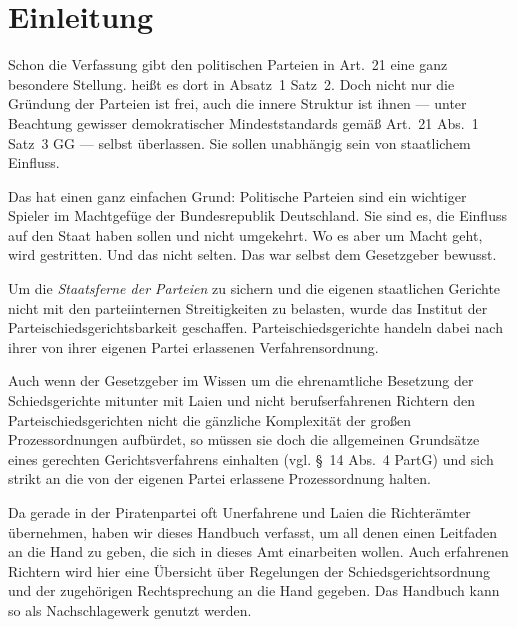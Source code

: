 
\chapter{Einleitung}
Schon die Verfassung gibt den politischen Parteien in Art.~21 eine ganz besondere Stellung.
 heißt es dort in Absatz~1 Satz~2.
Doch nicht nur die Gründung der Parteien ist frei, auch die innere Struktur ist ihnen --- unter Beachtung gewisser demokratischer Mindeststandards gemäß Art.~21 Abs.~1 Satz~3 GG --- selbst überlassen.
Sie sollen unabhängig sein von staatlichem Einfluss.

Das hat einen ganz einfachen Grund:
Politische Parteien sind ein wichtiger Spieler im Machtgefüge der Bundesrepublik Deutschland.
Sie sind es, die Einfluss auf den Staat haben sollen und nicht umgekehrt.
Wo es aber um Macht geht, wird gestritten.
Und das nicht selten.
Das war selbst dem Gesetzgeber bewusst.

Um die \emph{Staatsferne der Parteien} zu sichern und die eigenen staatlichen Gerichte nicht mit den parteiinternen Streitigkeiten zu belasten, wurde das Institut der Parteischiedsgerichtsbarkeit geschaffen.
Parteischiedsgerichte handeln dabei nach ihrer von ihrer eigenen Partei erlassenen Verfahrensordnung.

Auch wenn der Gesetzgeber im Wissen um die ehrenamtliche Besetzung der Schiedsgerichte mitunter mit Laien und nicht berufserfahrenen Richtern den Parteischiedsgerichten nicht die gänzliche Komplexität der großen Prozessordnungen aufbürdet, so müssen sie doch die allgemeinen Grundsätze eines gerechten Gerichtsverfahrens einhalten (vgl. \S~14 Abs.~4 PartG) und sich strikt an die von der eigenen Partei erlassene Prozessordnung halten.

Da gerade in der Piratenpartei oft Unerfahrene und Laien die Richterämter übernehmen, haben wir dieses Handbuch verfasst, um all denen einen Leitfaden an die Hand zu geben, die sich in dieses Amt einarbeiten wollen.
Auch erfahrenen Richtern wird hier eine Übersicht über Regelungen der Schiedsgerichtsordnung und der zugehörigen Rechtsprechung an die Hand gegeben.
Das Handbuch kann so als Nachschlagewerk genutzt werden.

